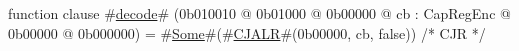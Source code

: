 function clause #\hyperref[sailMIPSzdecode]{decode}# (0b010010 @ 0b01000 @ 0b00000    @ cb : CapRegEnc @ 0b00000 @ 0b000000) = #\hyperref[sailMIPSzSome]{Some}#(#\hyperref[sailMIPSzCJALR]{CJALR}#(0b00000, cb, false)) /* CJR */

